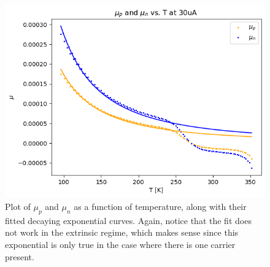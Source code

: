 \documentclass[10pt]{article}
\begin{document}
	\begin{figure}
		\centering
		\includegraphics[scale=0.75]{images/30uA-double-mu-plot.png}
		\caption{Plot of \( \mu_p \) and \( \mu_n \) as a function of temperature, along with their fitted
			decaying exponential curves. Again, notice that the fit does not work in the extrinsic regime, which
		makes sense since this exponential is only true in the case where there is one carrier present.}
		\label{double-plot}
	\end{figure}
\end{document}
